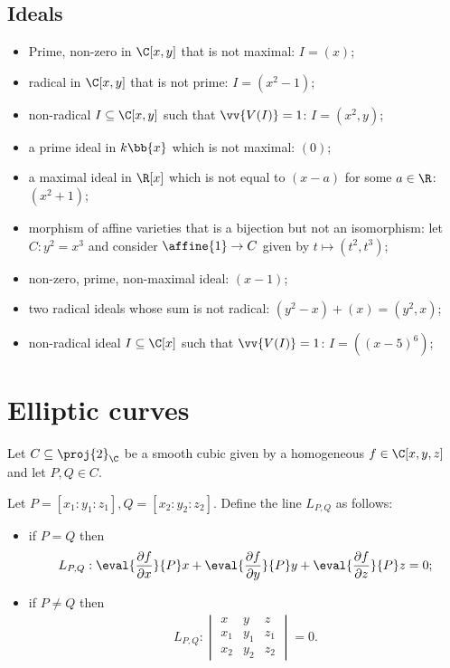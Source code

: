 \documentclass{article}
\begin{document}
\subsection{Ideals}

\begin{itemize}
  \item Prime, non-zero in $\C[x,y]$ that is not maximal: $I=(x)$;
  \item radical in $\C[x,y]$ that is not prime: $I=(x^2-1)$;
  \item non-radical $I\subseteq\C[x,y]$ such that
    $\vv{V(I)}=1$: $I=(x^2,y)$;
  \item a prime ideal in $k\bb{x}$ which is not maximal: $(0)$;
  \item a maximal ideal in $\R[x]$ which is not equal to
    $(x-a)$ for some $a\in\R$: $(x^2+1)$;
  \item morphism of affine varieties that is a bijection but not
    an isomorphism: let $C:y^2 = x^3$ and consider $\affine{1}\to C$
    given by $t\mapsto (t^2,t^3)$;
  \item non-zero, prime, non-maximal ideal: $(x-1)$;
  \item two radical ideals whose sum is not radical:
    $(y^2 - x) + (x) = (y^2,x)$;
  \item non-radical ideal $I\subseteq\C[x]$ such that
    $\vv{V(I)}=1$: $I=((x-5)^6)$;
\end{itemize}

\section{Elliptic curves}

Let $C\subseteq\proj{2}_\C$ be a smooth cubic given by a homogeneous
$f\in \C[x,y,z]$ and let $P,Q\in C$.

\begin{definition}
  Let $P=[x_1:y_1:z_1],Q=[x_2:y_2:z_2]$. Define the
  line $L_{P,Q}$ as follows:
  \begin{itemize}
    \item if $P=Q$ then
      \begin{align*}
        L_{P,Q} : \eval{\frac{\partial f}{\partial x}}{P}x
        + \eval{\frac{\partial f}{\partial y}}{P}y
        + \eval{\frac{\partial f}{\partial z}}{P}z
        = 0;
      \end{align*}
    \item if $P\neq Q$ then
      \begin{align*}
        L_{P,Q} :
        \begin{vmatrix}
          x & y & z \\
          x_1 & y_1 & z_1 \\
          x_2 & y_2 & z_2
        \end{vmatrix}
        = 0.
      \end{align*}
  \end{itemize}
\end{definition}
\end{document}
